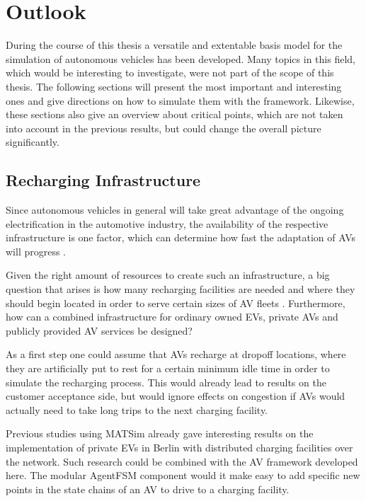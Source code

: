 \section{Outlook}
\label{sec:outlook}

During the course of this thesis a versatile and extentable basis model for the
simulation of autonomous vehicles has been developed. Many topics in this field,
which would be interesting to investigate, were not part of the scope of this thesis.
The following sections will present the most important and interesting ones and
give directions on how to simulate them with the framework. Likewise, these sections
also give an overview about critical points, which are not taken into account in
the previous results, but could change the overall picture significantly.

\subsection{Recharging Infrastructure}

Since autonomous vehicles in general will take great advantage of the ongoing
electrification in the automotive industry, the availability of the respective
infrastructure is one factor, which can determine how fast the adaptation of AVs
will progress .

Given the right amount of resources to create such an infrastructure, a big question
that arises is how many recharging facilities are needed and where they should begin
located in order to serve certain sizes of AV fleets \citep{Chen2015}. Furthermore, how can a combined
infrastructure for ordinary owned EVs, private AVs and publicly provided AV services
be designed?

As a first step one could assume that AVs recharge at dropoff locations, where they
are artificially put to rest for a certain minimum idle time in order to simulate
the recharging process. This would already lead to results on the customer acceptance
side, but would ignore effects on congestion if AVs would actually need to take long
trips to the next charging facility.

Previous studies using MATSim already gave interesting results on the implementation
of private EVs  in Berlin with distributed charging facilities
over the network. Such research could be combined with the AV framework developed here.
The modular AgentFSM component would it make easy to add specific new points in the
state chains of an AV to drive to a charging facility.

